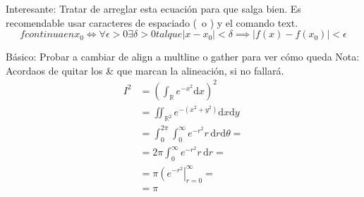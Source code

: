 \documentclass[11pt, a4paper]{article}
\begin{document}
Interesante: Tratar de arreglar esta ecuación para que salga bien.
Es recomendable usar caracteres de espaciado (\, o \;) y el comando text.
\[ f continua en x_0 \iff \forall \epsilon > 0 \exists \delta > 0 tal que |x - x_0| < \delta \implies |f(x) - f(x_0)| < \epsilon \]

Básico: Probar a cambiar de align a multline o gather para ver cómo queda
Nota: Acordaos de quitar los \& que marcan la alineación, si no fallará.
\begin{align*} I^2 &=
	\left(\int_{\mathbb{R}} e^{-x^2} \mathrm{d}x\right)^2 \\
	&= \iint_{\mathbb{R}^2} e^{-(x^2+y^2)} \mathrm{d}x \mathrm{d}y \\
	&= \int_0^{2\pi} \int_{0}^\infty e^{-r^2} r\, \mathrm{d} r \mathrm{d} \theta = \\
	&= 2 \pi \int_{0}^\infty e^{-r^2} r\, \mathrm{d} r = \\
	&= \pi \left(e^{-r^2}\right|_{r = 0}^{\infty} = \\
	&= \pi
\end{align*}
\end{document}
